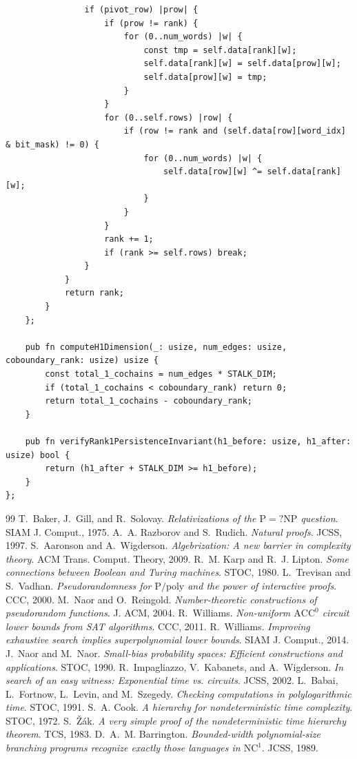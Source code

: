 \documentclass[11pt,a4paper]{article}
\theoremstyle{definition}
\theoremstyle{remark}
\begin{document}
\begin{lstlisting}
                if (pivot_row) |prow| {
                    if (prow != rank) {
                        for (0..num_words) |w| {
                            const tmp = self.data[rank][w];
                            self.data[rank][w] = self.data[prow][w];
                            self.data[prow][w] = tmp;
                        }
                    }
                    for (0..self.rows) |row| {
                        if (row != rank and (self.data[row][word_idx] & bit_mask) != 0) {
                            for (0..num_words) |w| {
                                self.data[row][w] ^= self.data[rank][w];
                            }
                        }
                    }
                    rank += 1;
                    if (rank >= self.rows) break;
                }
            }
            return rank;
        }
    };

    pub fn computeH1Dimension(_: usize, num_edges: usize, coboundary_rank: usize) usize {
        const total_1_cochains = num_edges * STALK_DIM;
        if (total_1_cochains < coboundary_rank) return 0;
        return total_1_cochains - coboundary_rank;
    }

    pub fn verifyRank1PersistenceInvariant(h1_before: usize, h1_after: usize) bool {
        return (h1_after + STALK_DIM >= h1_before);
    }
};
\end{lstlisting}

\begin{thebibliography}{99}
 T.~Baker, J.~Gill, and R.~Solovay. \emph{Relativizations of the $\mathrm{P}=?\mathrm{NP}$ question}. SIAM J. Comput., 1975.
 A.~A. Razborov and S.~Rudich. \emph{Natural proofs}. JCSS, 1997.
 S.~Aaronson and A.~Wigderson. \emph{Algebrization: A new barrier in complexity theory}. ACM Trans. Comput. Theory, 2009.
 R.~M. Karp and R.~J. Lipton. \emph{Some connections between Boolean and Turing machines}. STOC, 1980.
 L.~Trevisan and S.~Vadhan. \emph{Pseudorandomness for $\mathrm{P/poly}$ and the power of interactive proofs}. CCC, 2000.
 M.~Naor and O.~Reingold. \emph{Number-theoretic constructions of pseudorandom functions}. J. ACM, 2004.
 R.~Williams. \emph{Non-uniform $\mathrm{ACC}^0$ circuit lower bounds from SAT algorithms}. CCC, 2011.
 R.~Williams. \emph{Improving exhaustive search implies superpolynomial lower bounds}. SIAM J. Comput., 2014.
 J.~Naor and M.~Naor. \emph{Small-bias probability spaces: Efficient constructions and applications}. STOC, 1990.
 R.~Impagliazzo, V.~Kabanets, and A.~Wigderson. \emph{In search of an easy witness: Exponential time vs. circuits}. JCSS, 2002.
 L.~Babai, L.~Fortnow, L.~Levin, and M.~Szegedy. \emph{Checking computations in polylogarithmic time}. STOC, 1991.
 S.~A. Cook. \emph{A hierarchy for nondeterministic time complexity}. STOC, 1972.
 S.~\v{Z}\'ak. \emph{A very simple proof of the nondeterministic time hierarchy theorem}. TCS, 1983.
 D.~A.~M. Barrington. \emph{Bounded-width polynomial-size branching programs recognize exactly those languages in $\mathrm{NC}^1$}. JCSS, 1989.
\end{thebibliography}
\end{document}

